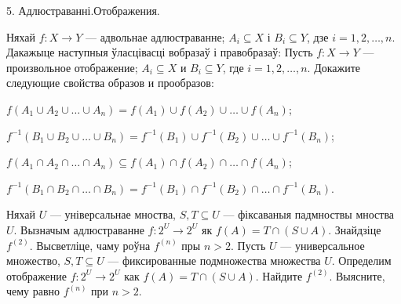 



\biLangHeader
{5. Адлюстраванні.}{Отображения.}

\begin{problemList}

\problemItemWithCommonPart
{Няхай $f \colon X \to Y$ --- адвольнае адлюстраванне;
$A_i \subseteq X$ і $B_i \subseteq Y$, дзе $i = 1, 2, \ldots, n$. 
Дакажыце наступныя ўласцівасці вобразаў і правобразаў:}
{Пусть $f \colon X \to Y$ --- произвольное отображение; 
$A_i \subseteq X$ и $B_i \subseteq Y$, где $i = 1, 2, \ldots, n$.
Докажите следующие свойства образов и прообразов:}
{%
\begin{belarusianEnumerate}
	
\item $f(A_1 \cup A_2 \cup \ldots \cup A_n) = f(A_1) \cup f(A_2) \cup \ldots \cup f(A_n)$;

\item $f^{-1}(B_1 \cup B_2 \cup \ldots \cup B_n) = f^{-1}(B_1) \cup f^{-1}(B_2) \cup \ldots \cup f^{-1}(B_n)$;

\item $f(A_1 \cap A_2 \cap \ldots \cap A_n) \subseteq f(A_1) \cap f(A_2) \cap \ldots \cap f(A_n)$;

\item $f^{-1}(B_1 \cap B_2 \cap \ldots \cap B_n) = f^{-1}(B_1) \cap f^{-1}(B_2) \cap \ldots \cap f^{-1}(B_n)$.
	
\end{belarusianEnumerate}
}

\bigskip

\problemItemSimple
{Няхай $U$ --- універсальнае мноства, $S, T \subseteq U$ --- фіксаваныя падмноствы мноства $U$. Вызначым адлюстраванне $f \colon 2^U \to 2^U$ як $f(A) = T \cap (S \cup A)$. Знайдзіце $f^{(2)}$. Высветліце, чаму роўна $f^{(n)}$ пры $n > 2$.}
{Пусть $U$ --- универсальное множество, $S, T \subseteq U$ --- фиксированные подмножества множества $U$. Определим отображение $f \colon 2^U \to 2^U$ как $f(A) = T \cap (S \cup A)$. Найдите $f^{(2)}$. Выясните, чему равно $f^{(n)}$ при $n > 2$.}

\bigskip


\end{problemList}
